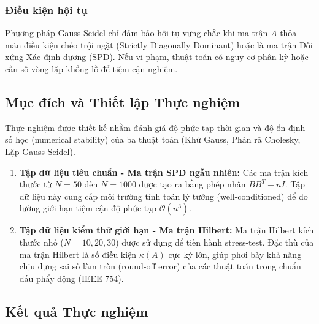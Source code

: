 \documentclass[12pt,a4paper]{article}
\begin{document}
\subsubsection{Điều kiện hội tụ}
Phương pháp Gauss-Seidel chỉ đảm bảo hội tụ vững chắc khi ma trận $A$ thỏa mãn điều kiện chéo trội ngặt (Strictly Diagonally Dominant) hoặc là ma trận Đối xứng Xác định dương (SPD). Nếu vi phạm, thuật toán có nguy cơ phân kỳ hoặc cần số vòng lặp khổng lồ để tiệm cận nghiệm.

\subsection{Mục đích và Thiết lập Thực nghiệm}
Thực nghiệm được thiết kế nhằm đánh giá độ phức tạp thời gian và độ ổn định số học (numerical stability) của ba thuật toán (Khử Gauss, Phân rã Cholesky, Lặp Gauss-Seidel). 

\begin{enumerate}[label=\textbf{\alph*)}]
    \item \textbf{Tập dữ liệu tiêu chuẩn - Ma trận SPD ngẫu nhiên:} Các ma trận kích thước từ $N=50$ đến $N=1000$ được tạo ra bằng phép nhân $B B^T + nI$. Tập dữ liệu này cung cấp môi trường tính toán lý tưởng (well-conditioned) để đo lường giới hạn tiệm cận độ phức tạp $\mathcal{O}(n^3)$.
    
    \item \textbf{Tập dữ liệu kiểm thử giới hạn - Ma trận Hilbert:} Ma trận Hilbert kích thước nhỏ ($N=10, 20, 30$) được sử dụng để tiến hành stress-test. Đặc thù của ma trận Hilbert là số điều kiện $\kappa(A)$ cực kỳ lớn, giúp phơi bày khả năng chịu đựng sai số làm tròn (round-off error) của các thuật toán trong chuẩn dấu phẩy động (IEEE 754).
\end{enumerate}

\subsection{Kết quả Thực nghiệm}
\end{document}
